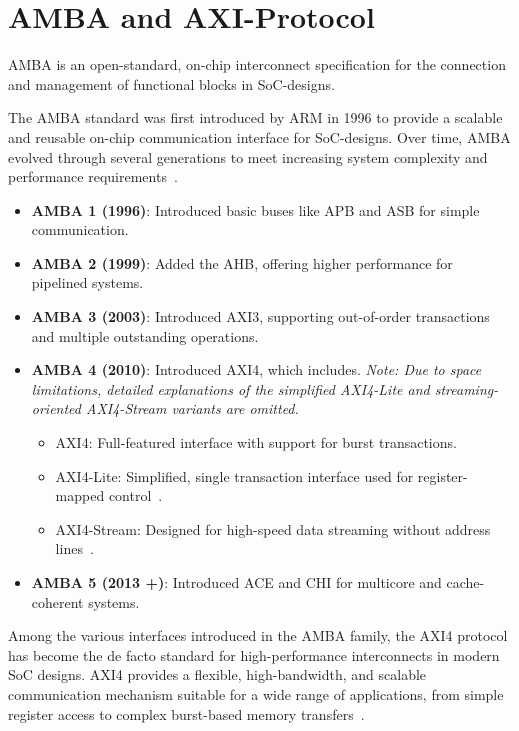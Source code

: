 \section{AMBA and AXI-Protocol}

\acl{AMBA} is an open-standard, on-chip interconnect specification for the connection and management of functional blocks in \acs{SoC}-designs. 

The \ac{AMBA} standard was first introduced by ARM in 1996 to provide a scalable and reusable on-chip communication interface for \acs{SoC}-designs. Over time, \acs{AMBA} evolved through several generations to meet increasing system complexity and performance requirements~\cite{walshe_what_2014}.

\begin{itemize}
    \item \textbf{AMBA 1 (1996)}: Introduced basic buses like \ac{APB} and \ac{ASB} for simple communication.
    \item \textbf{AMBA 2 (1999)}: Added the \ac{AHB}, offering higher performance for pipelined systems.
    \item \textbf{AMBA 3 (2003)}: Introduced \ac{AXI3}, supporting out-of-order transactions and multiple outstanding operations.
    \item \textbf{AMBA 4 (2010)}: Introduced \ac{AXI4}, which includes. \textit{Note: Due to space limitations, detailed explanations of the simplified AXI4-Lite and streaming-oriented AXI4-Stream variants are omitted.}
        \begin{itemize}
            \item AXI4: Full-featured interface with support for burst transactions.
            \item AXI4-Lite: Simplified, single transaction interface used for register-mapped control~\cite{arm_amba_2021}.
            \item AXI4-Stream: Designed for high-speed data streaming without address lines~\cite{arm_amba_2021-1}.
        \end{itemize}
    \item \textbf{AMBA 5 (2013 +)}: Introduced \ac{ACE} and \ac{CHI} for multicore and cache-coherent systems.
\end{itemize}

Among the various interfaces introduced in the AMBA family, the \ac{AXI4} protocol has become the de facto standard for high-performance interconnects in modern SoC designs. AXI4 provides a flexible, high-bandwidth, and scalable communication mechanism suitable for a wide range of applications, from simple register access to complex burst-based memory transfers~\cite{aldec_inc_xilinx_2025}.

